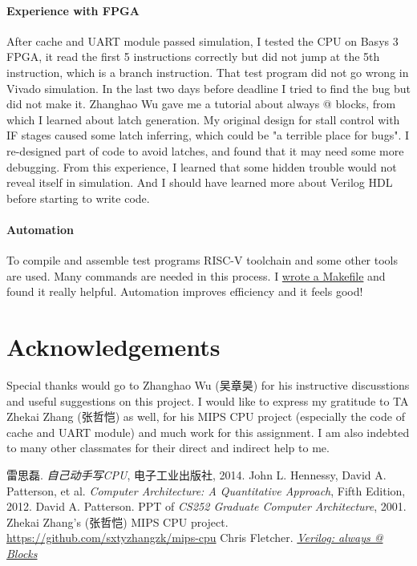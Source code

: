 \documentclass[12pt, a4paper]{article}
\theoremstyle{margin}
\begin{document}
\paragraph{Experience with FPGA} After cache and UART module passed simulation, I tested the CPU on Basys 3 FPGA, it read the first 5 instructions correctly but did not jump at the 5th instruction, which is a branch instruction. That test program did not go wrong in Vivado simulation. In the last two days before deadline I tried to find the bug but did not make it. Zhanghao Wu gave me a tutorial about always @ blocks\cite{always}, from which I learned about latch generation. My original design for stall control with IF stages caused some latch inferring, which could be "a
terrible place for bugs"\cite{always}. I re-designed part of code to avoid latches, and found that it may need some more debugging. From this experience, I learned that some hidden trouble would not reveal itself in simulation. And I should have learned more about Verilog HDL before starting to write code.

\paragraph{Automation} To compile and assemble test programs RISC-V toolchain and some other tools are used. Many commands are needed in this process. I \href{http://blog.evensgn.com/riscv-gnu-toolchain/}{wrote a Makefile} and found it really helpful. Automation improves efficiency and it feels good!

\section{Acknowledgements}
Special thanks would go to Zhanghao Wu (吴章昊) for his instructive discusstions and useful suggestions on this project. I would like to express my gratitude to TA Zhekai Zhang (张哲恺) as well, for his MIPS CPU project (especially the code of cache and UART module) and much work for this assignment. I am also indebted to many other classmates for their direct and indirect help to me.

\begin{thebibliography}{9}
  	雷思磊.
  	\emph{自己动手写CPU},
  	电子工业出版社, 2014.
	John L. Hennessy, David A. Patterson, et al.
	\emph{Computer Architecture: A Quantitative Approach},
	Fifth Edition, 2012.
	David A. Patterson.
	PPT of \emph{CS252 Graduate Computer Architecture},
	2001.
  	Zhekai Zhang's (张哲恺) MIPS CPU project.
  	\url{https://github.com/sxtyzhangzk/mips-cpu}
  	Chris Fletcher.
  	\emph{\href{https://github.com/Evensgn/RISC-V-CPU/blob/dev/doc/Always@.pdf}{Verilog: always @ Blocks}}
  
\end{thebibliography}
\end{document}
